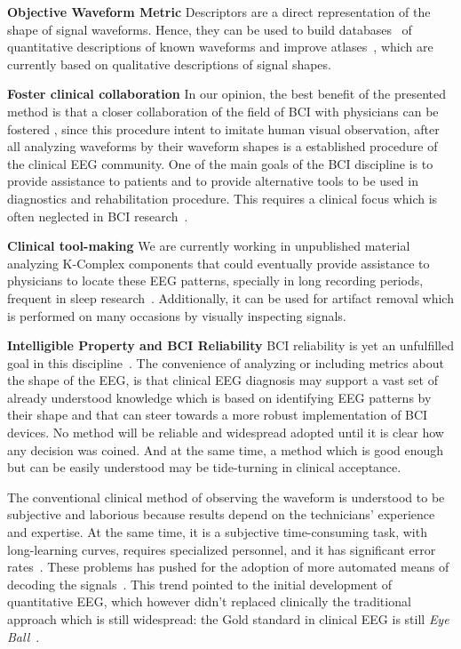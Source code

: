 \textbf{Objective Waveform Metric}
Descriptors are a direct representation of the shape of signal waveforms. Hence,  they can be used to build databases~\cite{Chavarriaga2017} of quantitative descriptions of known waveforms and improve atlases~\cite{Hartman2005}, which are currently based on qualitative descriptions of signal shapes.

\textbf{Foster clinical collaboration}
In our opinion, the best benefit of the presented method is that a closer collaboration of the field of BCI with physicians can be fostered \cite{Chavarriaga2017}, since this procedure intent to imitate human visual observation, after all analyzing waveforms by their waveform shapes is a established procedure of the clinical EEG community. One of the main goals of the BCI discipline is to provide assistance to patients and to provide alternative tools to be used in diagnostics and rehabilitation procedure.  This requires a clinical focus which is often neglected in BCI research~\cite{Chavarriaga2017}.  

\textbf{Clinical tool-making}
We are currently working in unpublished material analyzing K-Complex components that could eventually provide  assistance to physicians to locate these EEG patterns, specially in long recording periods, frequent in sleep research~\cite{Michel2012}.  %
Additionally, it can be used for artifact removal which is performed on many occasions by visually inspecting signals. 


\textbf{Intelligible Property and BCI Reliability}
BCI reliability is yet an unfulfilled goal in this discipline~\cite{WolpawJonathanR2012}. The convenience of analyzing or including metrics about the shape of the EEG, is that clinical EEG diagnosis may support a vast set of already understood knowledge which is based on identifying EEG patterns by their shape and that can steer towards a more robust implementation of BCI devices.  No method will be reliable and widespread adopted until it is clear how any decision was coined. And at the same time, a method which is good enough but can be easily understood may be tide-turning in clinical acceptance.

The conventional clinical method of observing the waveform is understood to be subjective and laborious because results depend on the technicians' experience and expertise.   At the same time, it is a subjective time-consuming task, with long-learning curves, requires specialized personnel, and it has significant error rates~\cite{Tjepkema-Cloostermans2018}.  These problems has pushed for the adoption of more automated means of decoding the signals~\cite{Thakor2004}.   This trend pointed to the initial development of quantitative EEG, which however didn't replaced clinically the traditional approach which is still widespread: the Gold standard in clinical EEG is still \textit{Eye Ball}~\cite{Wulsin2011,Tjepkema-Cloostermans2018}.  


